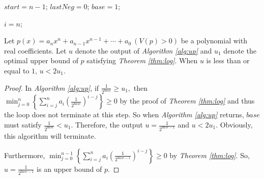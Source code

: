 \begin{algorithm}[H]
	\caption{\up  \label{alg:up}}
	\DontPrintSemicolon
	$start=n-1$;
	$lastNeg=0$;
	$base=1$;
	
	
	
	$i=n$;\;

\end{algorithm}



\begin{theorem}
	\label{thm:two}
	Let $p(x)=a_nx^n+a_{n-1}x^{n-1}+\cdots+a_0\ (V(p)> 0)$ be a polynomial with real coefficients. Let  $u$ denote the output of {\em Algorithm \ref{alg:up}} and $u_1$ denote the optimal upper bound of $p$ satisfying
	{\em Theorem \ref{thm:log}}. When $u$ is less than or equal to $1$, $u<2u_1$.
	
\end{theorem}


\begin{proof}
	In {\em Algorithm \ref{alg:up}}, if  $\frac{1}{2^{base}}\ge u_1,$ then $\min_{j=0}^{n}\left\{ \sum_{i=j}^na_i\left( {\frac{1}{2^{base}} }
	\right)^{i-j}\right \}\ge 0$ by the proof of {\em Theorem \ref{thm:log}} and thus
	the loop does not terminate at this step.
	So when {\em Algorithm \ref{alg:up}} returns, $base$ must satisfy $\frac{1}{2^{base}}<u_1$. Therefore, the output $u=\frac{1}{2^{base-1}}$ and $u<2u_1$.
	Obviously, this algorithm will terminate.
	
	Furthermore,  $\min_{j=0}^{n-1}\left\{ \sum_{i=j}^na_i\left( {\frac{1}{2^{base-1}} } \right)^{i-j}\right \}\ge 0$ by {\em Theorem \ref{thm:log}}. So, $u=\frac{1}{2^{base-1}}$ is an upper bound of $p$.
\end{proof}



